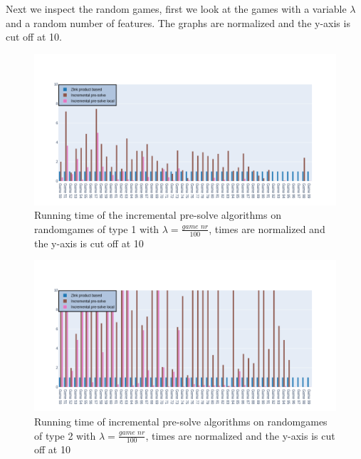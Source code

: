 Next we inspect the random games, first we look at the games with a variable $\lambda$ and a random number of features. The graphs are normalized and the y-axis is cut off at 10.
\begin{figure}[H]
	\includegraphics[width=1\linewidth]{"results/FF_randomgames/Zlnk product based_Incremental pre-solve_Incremental pre-solve local_"}
	\caption{Running time of the incremental pre-solve algorithms on randomgames of type 1 with $\lambda = \frac{\textit{game nr}}{100}$, times are normalized and the y-axis is cut off at 10}
	\label{fig:elevatorzlnks}
\end{figure}%
\begin{figure}[H]
	\includegraphics[width=1\linewidth]{"results/FC_randomgames/Zlnk product based_Incremental pre-solve_Incremental pre-solve local_"}
	\caption{Running time of incremental pre-solve algorithms on randomgames of type 2 with $\lambda = \frac{\textit{game nr}}{100}$, times are normalized and the y-axis is cut off at 10}
	\label{fig:elevatorzlnks}
\end{figure}%

